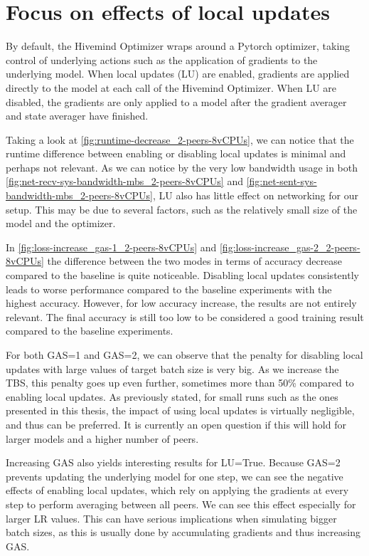 \section{Focus on effects of local updates}\label{sec:focus-local-updates}
By default, the Hivemind Optimizer wraps around a Pytorch optimizer, taking control of underlying actions such as the application of gradients to the underlying model.
When local updates (LU) are enabled, gradients are applied directly to the model at each call of the Hivemind Optimizer.
When LU are disabled, the gradients are only applied to a model after the gradient averager and state averager have finished.

Taking a look at \autoref{fig:runtime-decrease_2-peers-8vCPUs}, we can notice that the runtime difference between enabling or disabling local updates is minimal and perhaps not relevant.
As we can notice by the very low bandwidth usage in both \autoref{fig:net-recv-sys-bandwidth-mbs_2-peers-8vCPUs} and \autoref{fig:net-sent-sys-bandwidth-mbs_2-peers-8vCPUs}, LU also has little effect on networking for our setup.
This may be due to several factors, such as the relatively small size of the model and the optimizer.

In \autoref{fig:loss-increase_gas-1_2-peers-8vCPUs} and \autoref{fig:loss-increase_gas-2_2-peers-8vCPUs} the difference between the two modes in terms of accuracy decrease compared to the baseline is quite noticeable.
Disabling local updates consistently leads to worse performance compared to the baseline experiments with the highest accuracy.
However, for low accuracy increase, the results are not entirely relevant.
The final accuracy is still too low to be considered a good training result compared to the baseline experiments.

For both GAS=1 and GAS=2, we can observe that the penalty for disabling local updates with large values of target batch size is very big.
As we increase the TBS, this penalty goes up even further, sometimes more than 50\% compared to enabling local updates.
As previously stated, for small runs such as the ones presented in this thesis, the impact of using local updates is virtually negligible, and thus can be preferred.
It is currently an open question if this will hold for larger models and a higher number of peers.

Increasing GAS also yields interesting results for LU=True.
Because GAS=2 prevents updating the underlying model for one step, we can see the negative effects of enabling local updates, which rely on applying the gradients at every step to perform averaging between all peers.
We can see this effect especially for larger LR values.
This can have serious implications when simulating bigger batch sizes, as this is usually done by accumulating gradients and thus increasing GAS.

